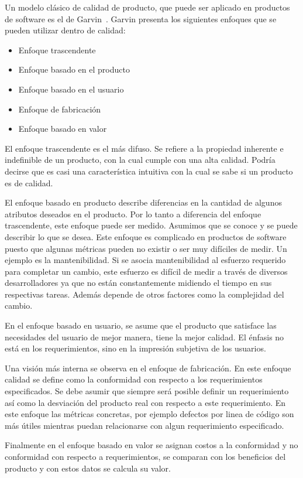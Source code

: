Un modelo clásico de calidad de producto, que puede ser aplicado en productos
de software es el de Garvin~\cite{Garvin:1984}. Garvin presenta los siguientes
enfoques que se pueden utilizar dentro de calidad:
\begin{itemize}
    \item Enfoque trascendente
    \item Enfoque basado en el producto
    \item Enfoque basado en el usuario
    \item Enfoque de fabricación
    \item Enfoque basado en valor
\end{itemize}

El enfoque trascendente es el más difuso. Se refiere a la propiedad inherente
e indefinible de un producto, con la cual cumple con una alta calidad. Podría
decirse que es casi una característica intuitiva con la cual se sabe si un
producto es de calidad.

El enfoque basado en producto describe diferencias en la cantidad de algunos
atributos deseados en el producto. Por lo tanto a diferencia del enfoque
trascendente, este enfoque puede ser medido. Asumimos que se conoce
y se puede describir lo que se desea.
Este enfoque es complicado en productos de software puesto que algunas métricas
pueden no existir o ser muy difíciles de medir. Un ejemplo es la mantenibilidad.
Si se asocia mantenibilidad al esfuerzo requerido para completar un cambio, este
esfuerzo es difícil de medir a través de diversos desarrolladores ya que no están
constantemente midiendo el tiempo en sus respectivas tareas. Además depende de 
otros factores como la complejidad del cambio.

En el enfoque basado en usuario, se asume que el producto que satisface
las necesidades del usuario de mejor manera, tiene la mejor calidad. El énfasis
no está en los requerimientos, sino en la impresión subjetiva de los usuarios.

Una visión más interna se observa en el enfoque de fabricación. En este enfoque
calidad se define como la conformidad con respecto a los requerimientos especificados.
Se debe asumir que siempre será posible definir un requerimiento así como la desviación
del producto real con respecto a este requerimiento. En este enfoque las métricas
concretas, por ejemplo defectos por linea de código son más útiles mientras puedan
relacionarse con algun requerimiento especificado.

Finalmente en el enfoque basado en valor se asignan costos a la conformidad y no
conformidad con respecto a requerimientos, se comparan con los beneficios del
producto y con estos datos se calcula su valor.

